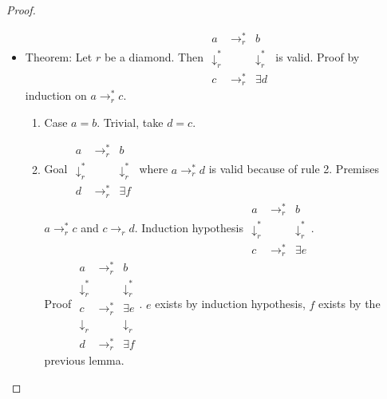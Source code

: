 \begin{theorem}
\begin{proof}
\begin{itemize}
    \item Theorem:  Let $r$ be a diamond. Then
      $\begin{matrix}
        a                     & \to_r^*     & b \\
        \downarrow_r^* &                 & \downarrow_r^* \\
        c                        & \to_r^*     & \exists d
      \end{matrix}$ is valid.
      Proof by induction on $a \to_r^* c$.
      \begin{enumerate}
      \item
        Case $a = b$. Trivial, take $d=c$.
      \item
        Goal
        $\begin{matrix}
          a                     & \to_r^*     & b \\
          \downarrow_r^* &                 & \downarrow_r^* \\
          d                        & \to_r^*     & \exists f
        \end{matrix}$ where $a \to_r^* d$ is valid because of rule 2.
        Premises $a \to_r^* c$ and $c \to_r d$.
        Induction hypothesis
        $\begin{matrix}
          a                     & \to_r^*     & b \\
          \downarrow_r^* &                 & \downarrow_r^* \\
          c                        & \to_r^*     & \exists e
        \end{matrix}$.
        \\
        Proof
        $\begin{matrix}
          a                        & \to_r^*  & b\\
          \downarrow_r^* &              & \downarrow_r^* \\
          c                        & \to_r^*  & \exists e  \\
          \downarrow_r    &              & \downarrow_r \\
          d                        & \to_r^*  & \exists f
        \end{matrix}$.
        $e$ exists by induction hypothesis, $f$ exists by the previous lemma.
      \end{enumerate}
    \end{itemize}
  \end{proof}
\end{theorem}

